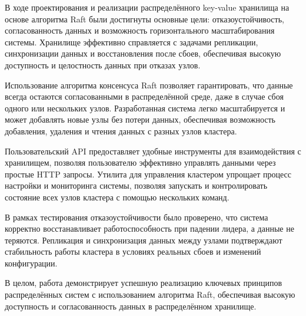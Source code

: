\conclusion

В ходе проектирования и реализации распределённого key-value хранилища на основе алгоритма Raft были достигнуты основные цели:
отказоустойчивость, согласованность данных и возможность горизонтального масштабирования системы. Хранилище эффективно справляется
с задачами репликации, синхронизации данных и восстановления после сбоев, обеспечивая высокую доступность и целостность данных при
отказах узлов.

Использование алгоритма консенсуса Raft позволяет гарантировать, что данные всегда остаются согласованными в распределённой среде,
даже в случае сбоя одного или нескольких узлов. Разработанная система легко масштабируется и может добавлять новые узлы без потери
данных, обеспечивая возможность добавления, удаления и чтения данных с разных узлов кластера.

Пользовательский API предоставляет удобные инструменты для взаимодействия с хранилищем, позволяя пользователю эффективно управлять
данными через простые HTTP запросы. Утилита для управления кластером упрощает процесс настройки и мониторинга системы, позволяя
запускать и контролировать состояние всех узлов кластера с помощью нескольких команд.

В рамках тестирования отказоустойчивости было проверено, что система корректно восстанавливает работоспособность при падении лидера,
а данные не теряются. Репликация и синхронизация данных между узлами подтверждают стабильность работы кластера в условиях реальных
сбоев и изменений конфигурации.

В целом, работа демонстрирует успешную реализацию ключевых принципов распределённых систем с использованием алгоритма Raft,
обеспечивая высокую доступность и согласованность данных в распределённом хранилище.
